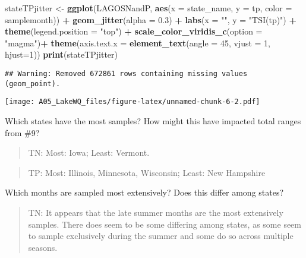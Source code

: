 \documentclass[]{article}
\newenvironment{Shaded}{\begin{snugshade}}{\end{snugshade}}
\newcommand{\DataTypeTok}[1]{\textcolor[rgb]{0.13,0.29,0.53}{#1}}
\newcommand{\DecValTok}[1]{\textcolor[rgb]{0.00,0.00,0.81}{#1}}
\newcommand{\FloatTok}[1]{\textcolor[rgb]{0.00,0.00,0.81}{#1}}
\newcommand{\KeywordTok}[1]{\textcolor[rgb]{0.13,0.29,0.53}{\textbf{#1}}}
\newcommand{\NormalTok}[1]{#1}
\newcommand{\OperatorTok}[1]{\textcolor[rgb]{0.81,0.36,0.00}{\textbf{#1}}}
\newcommand{\StringTok}[1]{\textcolor[rgb]{0.31,0.60,0.02}{#1}}
\begin{document}
\begin{Shaded}
\begin{Highlighting}[]
\NormalTok{stateTPjitter <-}\StringTok{ }\KeywordTok{ggplot}\NormalTok{(LAGOSNandP, }\KeywordTok{aes}\NormalTok{(}\DataTypeTok{x =}\NormalTok{ state_name, }\DataTypeTok{y =}\NormalTok{ tp, }\DataTypeTok{color =}\NormalTok{ samplemonth)) }\OperatorTok{+}
\StringTok{ }\KeywordTok{geom_jitter}\NormalTok{(}\DataTypeTok{alpha =} \FloatTok{0.3}\NormalTok{) }\OperatorTok{+}
\StringTok{  }\KeywordTok{labs}\NormalTok{(}\DataTypeTok{x =} \StringTok{""}\NormalTok{, }\DataTypeTok{y =} \StringTok{"TSI(tp)"}\NormalTok{) }\OperatorTok{+}
\StringTok{  }\KeywordTok{theme}\NormalTok{(}\DataTypeTok{legend.position =} \StringTok{"top"}\NormalTok{) }\OperatorTok{+}
\StringTok{  }\KeywordTok{scale_color_viridis_c}\NormalTok{(}\DataTypeTok{option =} \StringTok{"magma"}\NormalTok{)}\OperatorTok{+}
\StringTok{  }\KeywordTok{theme}\NormalTok{(}\DataTypeTok{axis.text.x =} \KeywordTok{element_text}\NormalTok{(}\DataTypeTok{angle =} \DecValTok{45}\NormalTok{, }\DataTypeTok{vjust =} \DecValTok{1}\NormalTok{, }\DataTypeTok{hjust=}\DecValTok{1}\NormalTok{))}
\KeywordTok{print}\NormalTok{(stateTPjitter)}
\end{Highlighting}
\end{Shaded}

\begin{verbatim}
## Warning: Removed 672861 rows containing missing values (geom_point).
\end{verbatim}

\texttt{[image: A05\_LakeWQ\_files/figure-latex/unnamed-chunk-6-2.pdf]}

Which states have the most samples? How might this have impacted total
ranges from \#9?

\begin{quote}
TN: Most: Iowa; Least: Vermont.
\end{quote}

\begin{quote}
TP: Most: Illinois, Minnesota, Wisconsin; Least: New Hampshire
\end{quote}

Which months are sampled most extensively? Does this differ among
states?

\begin{quote}
TN: It appears that the late summer months are the most extensively
samples. There does seem to be some differing among states, as some seem
to sample exclusively during the summer and some do so across multiple
seasons.
\end{quote}
\end{document}
